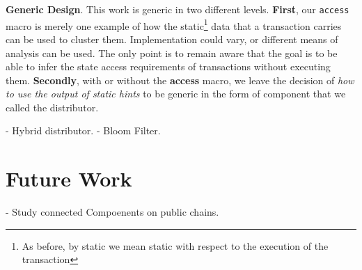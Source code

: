 \textbf{Generic Design}. This work is generic in two different levels. \textbf{First}, our
\texttt{access} macro is merely one example of how the static\footnote{As before, by static we mean
static with respect to the execution of the transaction} data that a transaction carries can be used
to cluster them. Implementation could vary, or different means of analysis can be used. The only
point is to remain aware that the goal is to be able to infer the state access requirements of
transactions without executing them. \textbf{Secondly}, with or without the \textbf{access} macro,
we leave the decision of \textit{how to use the output of static hints} to be generic in the form of
component that we called the distributor.

- Hybrid distributor.
- Bloom Filter.



\section{Future Work}

- Study connected Compoenents on public chains.
